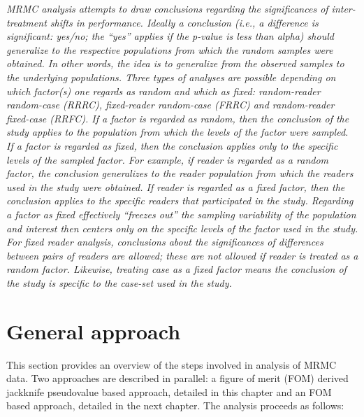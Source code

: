\documentclass[
]{book}
\begin{document}
\emph{MRMC analysis attempts to draw conclusions regarding the significances of inter-treatment shifts in performance. Ideally a conclusion (i.e., a difference is significant: yes/no; the ``yes'' applies if the p-value is less than alpha) should generalize to the respective populations from which the random samples were obtained. In other words, the idea is to generalize from the observed samples to the underlying populations. Three types of analyses are possible depending on which factor(s) one regards as random and which as fixed: random-reader random-case (RRRC), fixed-reader random-case (FRRC) and random-reader fixed-case (RRFC). If a factor is regarded as random, then the conclusion of the study applies to the population from which the levels of the factor were sampled. If a factor is regarded as fixed, then the conclusion applies only to the specific levels of the sampled factor. For example, if reader is regarded as a random factor, the conclusion generalizes to the reader population from which the readers used in the study were obtained. If reader is regarded as a fixed factor, then the conclusion applies to the specific readers that participated in the study. Regarding a factor as fixed effectively ``freezes out'' the sampling variability of the population and interest then centers only on the specific levels of the factor used in the study. For fixed reader analysis, conclusions about the significances of differences between pairs of readers are allowed; these are not allowed if reader is treated as a random factor. Likewise, treating case as a fixed factor means the conclusion of the study is specific to the case-set used in the study.}

\hypertarget{general-approach}{%
\section{General approach}\label{general-approach}}

This section provides an overview of the steps involved in analysis of MRMC data. Two approaches are described in parallel: a figure of merit (FOM) derived jackknife pseudovalue based approach, detailed in this chapter and an FOM based approach, detailed in the next chapter. The analysis proceeds as follows:
\end{document}
